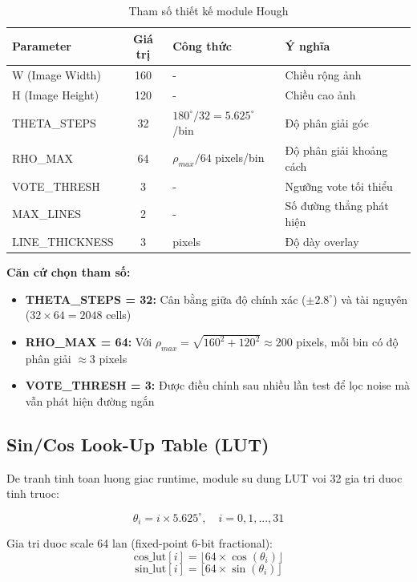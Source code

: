 \documentclass[12pt,a4paper]{article}
\begin{document}
\begin{table}[H]
\centering
\caption{Tham số thiết kế module Hough}
\label{tab:hough_design}
\begin{tabular}{|l|c|l|l|}
\hline
\textbf{Parameter} & \textbf{Giá trị} & \textbf{Công thức} & \textbf{Ý nghĩa} \\
\hline
W (Image Width) & 160 & - & Chiều rộng ảnh \\
\hline
H (Image Height) & 120 & - & Chiều cao ảnh \\
\hline
THETA\_STEPS & 32 & $180^\circ/32 = 5.625^\circ$/bin & Độ phân giải góc \\
\hline
RHO\_MAX & 64 & $\rho_{max}/64$ pixels/bin & Độ phân giải khoảng cách \\
\hline
VOTE\_THRESH & 3 & - & Ngưỡng vote tối thiểu \\
\hline
MAX\_LINES & 2 & - & Số đường thẳng phát hiện \\
\hline
LINE\_THICKNESS & 3 & pixels & Độ dày overlay \\
\hline
\end{tabular}
\end{table}

\textbf{Căn cứ chọn tham số:}

\begin{itemize}
    \item \textbf{THETA\_STEPS = 32:} Cân bằng giữa độ chính xác ($\pm 2.8^\circ$) và tài nguyên ($32 \times 64 = 2048$ cells)
    \item \textbf{RHO\_MAX = 64:} Với $\rho_{max} = \sqrt{160^2 + 120^2} \approx 200$ pixels, mỗi bin có độ phân giải $\approx 3$ pixels
    \item \textbf{VOTE\_THRESH = 3:} Được điều chỉnh sau nhiều lần test để lọc noise mà vẫn phát hiện đường ngắn
\end{itemize}

\subsection{Sin/Cos Look-Up Table (LUT)}

De tranh tinh toan luong giac runtime, module su dung LUT voi 32 gia tri duoc tinh truoc:

\begin{equation}
    \theta_i = i \times 5.625^\circ, \quad i = 0, 1, ..., 31
\end{equation}

Gia tri duoc scale 64 lan (fixed-point 6-bit fractional):
\begin{equation}
    \text{cos\_lut}[i] = \lfloor 64 \times \cos(\theta_i) \rfloor
\end{equation}
\begin{equation}
    \text{sin\_lut}[i] = \lfloor 64 \times \sin(\theta_i) \rfloor
\end{equation}
\end{document}

